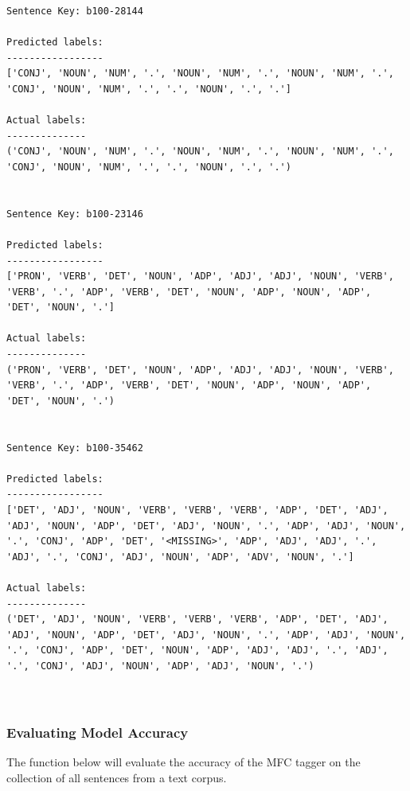 \documentclass[11pt]{article}
\begin{document}
    \begin{Verbatim}[commandchars=\\\{\}]
Sentence Key: b100-28144

Predicted labels:
-----------------
['CONJ', 'NOUN', 'NUM', '.', 'NOUN', 'NUM', '.', 'NOUN', 'NUM', '.', 'CONJ', 'NOUN', 'NUM', '.', '.', 'NOUN', '.', '.']

Actual labels:
--------------
('CONJ', 'NOUN', 'NUM', '.', 'NOUN', 'NUM', '.', 'NOUN', 'NUM', '.', 'CONJ', 'NOUN', 'NUM', '.', '.', 'NOUN', '.', '.')


Sentence Key: b100-23146

Predicted labels:
-----------------
['PRON', 'VERB', 'DET', 'NOUN', 'ADP', 'ADJ', 'ADJ', 'NOUN', 'VERB', 'VERB', '.', 'ADP', 'VERB', 'DET', 'NOUN', 'ADP', 'NOUN', 'ADP', 'DET', 'NOUN', '.']

Actual labels:
--------------
('PRON', 'VERB', 'DET', 'NOUN', 'ADP', 'ADJ', 'ADJ', 'NOUN', 'VERB', 'VERB', '.', 'ADP', 'VERB', 'DET', 'NOUN', 'ADP', 'NOUN', 'ADP', 'DET', 'NOUN', '.')


Sentence Key: b100-35462

Predicted labels:
-----------------
['DET', 'ADJ', 'NOUN', 'VERB', 'VERB', 'VERB', 'ADP', 'DET', 'ADJ', 'ADJ', 'NOUN', 'ADP', 'DET', 'ADJ', 'NOUN', '.', 'ADP', 'ADJ', 'NOUN', '.', 'CONJ', 'ADP', 'DET', '<MISSING>', 'ADP', 'ADJ', 'ADJ', '.', 'ADJ', '.', 'CONJ', 'ADJ', 'NOUN', 'ADP', 'ADV', 'NOUN', '.']

Actual labels:
--------------
('DET', 'ADJ', 'NOUN', 'VERB', 'VERB', 'VERB', 'ADP', 'DET', 'ADJ', 'ADJ', 'NOUN', 'ADP', 'DET', 'ADJ', 'NOUN', '.', 'ADP', 'ADJ', 'NOUN', '.', 'CONJ', 'ADP', 'DET', 'NOUN', 'ADP', 'ADJ', 'ADJ', '.', 'ADJ', '.', 'CONJ', 'ADJ', 'NOUN', 'ADP', 'ADJ', 'NOUN', '.')



    \end{Verbatim}

    \hypertarget{evaluating-model-accuracy}{%
\subsubsection{Evaluating Model
Accuracy}\label{evaluating-model-accuracy}}

The function below will evaluate the accuracy of the MFC tagger on the
collection of all sentences from a text corpus.
\end{document}
